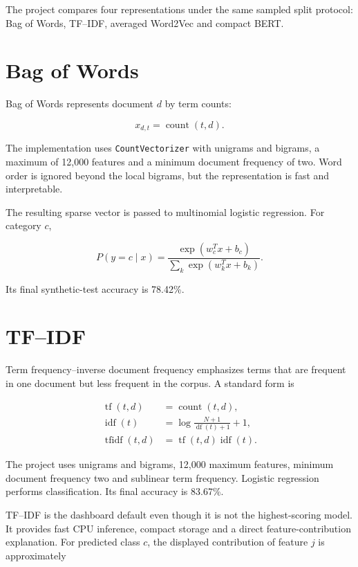 \documentclass[12pt,a4paper]{report}
\newcommand{\code}[1]{\texttt{#1}}
\begin{document}
The project compares four representations under the same sampled split protocol: Bag of Words, TF--IDF, averaged Word2Vec and compact BERT.

\section{Bag of Words}

Bag of Words represents document $d$ by term counts:

\begin{equation}
x_{d,t}=\operatorname{count}(t,d).
\end{equation}

The implementation uses \code{CountVectorizer} with unigrams and bigrams, a maximum of 12,000 features and a minimum document frequency of two. Word order is ignored beyond the local bigrams, but the representation is fast and interpretable.

The resulting sparse vector is passed to multinomial logistic regression. For category $c$,

\begin{equation}
P(y=c\mid x)=\frac{\exp(w_c^Tx+b_c)}{\sum_k\exp(w_k^Tx+b_k)}.
\end{equation}

Its final synthetic-test accuracy is 78.42\%.

\section{TF--IDF}

Term frequency--inverse document frequency emphasizes terms that are frequent in one document but less frequent in the corpus. A standard form is

\begin{align}
\operatorname{tf}(t,d)&=\operatorname{count}(t,d),\\
\operatorname{idf}(t)&=\log\frac{N+1}{\operatorname{df}(t)+1}+1,\\
\operatorname{tfidf}(t,d)&=\operatorname{tf}(t,d)\operatorname{idf}(t).
\end{align}

The project uses unigrams and bigrams, 12,000 maximum features, minimum document frequency two and sublinear term frequency. Logistic regression performs classification. Its final accuracy is 83.67\%.

TF--IDF is the dashboard default even though it is not the highest-scoring model. It provides fast CPU inference, compact storage and a direct feature-contribution explanation. For predicted class $c$, the displayed contribution of feature $j$ is approximately
\end{document}
